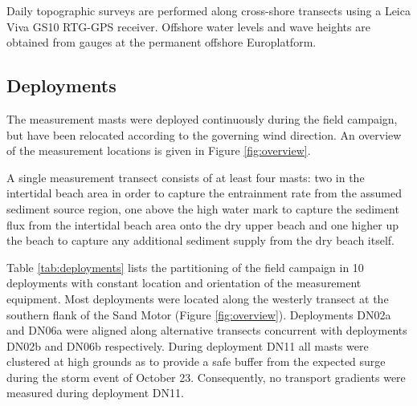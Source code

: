 Daily topographic surveys are performed along cross-shore transects
using a Leica Viva GS10 RTG-GPS receiver. Offshore water levels and
wave heights are obtained from gauges at the permanent offshore
Europlatform.

\subsection{Deployments}

The measurement masts were deployed continuously during the field
campaign, but have been relocated according to the governing wind
direction. An overview of the measurement locations is given in Figure
\ref{fig:overview}. 

A single measurement transect consists of at least four masts: two in
the intertidal beach area in order to capture the entrainment rate
from the assumed sediment source region, one above the high water mark
to capture the sediment flux from the intertidal beach area onto the
dry upper beach and one higher up the beach to capture any additional
sediment supply from the dry beach itself.  

Table \ref{tab:deployments} lists the partitioning of the field
campaign in 10 deployments with constant location and orientation of
the measurement equipment. Most deployments were located along the
westerly transect at the southern flank of the Sand Motor (Figure
\ref{fig:overview}). Deployments DN02a and DN06a were aligned along
alternative transects concurrent with deployments DN02b and DN06b
respectively. During deployment DN11 all masts were clustered at high
grounds as to provide a safe buffer from the expected surge during the
storm event of October 23. Consequently, no transport gradients were
measured during deployment DN11.

